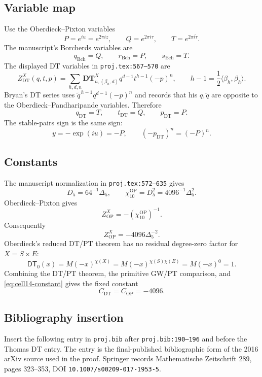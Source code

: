 \subsection{Variable map}

Use the Oberdieck--Pixton variables
\[
P=e^{iu}=e^{2\pi iz},\qquad
Q=e^{2\pi i\tau},\qquad
T=e^{2\pi i\widetilde\tau}.
\]
The manuscript's Borcherds variables are
\begin{equation}
\label{eq:cell14-borch-vars}
q_{\mathrm{Bch}}=Q,\qquad r_{\mathrm{Bch}}=P,\qquad
s_{\mathrm{Bch}}=T.
\end{equation}
The displayed DT variables in \texttt{proj.tex:567--570} are
\[
Z^X_{\mathrm{DT}}(q,t,p)
=\sum_{h,d,n}
\mathbf{DT}^X_{n,(\beta_h,d)}
q^{d-1}t^{h-1}(-p)^n,
\qquad h-1=\frac12\langle\beta_h,\beta_h\rangle.
\]
Bryan's DT series uses \(\widetilde q^{\,h-1}q^{d-1}(-p)^n\) and
records that his \(q,\widetilde q\) are opposite to the
Oberdieck--Pandharipande variables.  Therefore
\begin{equation}
\label{eq:cell14-dt-vars}
q_{\mathrm{DT}}=T,\qquad
t_{\mathrm{DT}}=Q,\qquad
p_{\mathrm{DT}}=P.
\end{equation}
The stable-pairs sign is the same sign:
\[
y=-\exp(iu)=-P,
\qquad
(-p_{\mathrm{DT}})^n=(-P)^n.
\]

\subsection{Constants}

The manuscript normalization in \texttt{proj.tex:572--635} gives
\[
D_5=64^{-1}\Delta_5,
\qquad
\chi_{10}^{\mathrm{OP}}=D_5^2=4096^{-1}\Delta_5^2.
\]
Oberdieck--Pixton gives
\[
Z^X_{\mathrm{OP}}
=-\left(\chi_{10}^{\mathrm{OP}}\right)^{-1}.
\]
Consequently
\begin{equation}
\label{eq:cell14-constant}
Z^X_{\mathrm{OP}}
=-4096\Delta_5^{-2}.
\end{equation}
Oberdieck's reduced DT/PT theorem has no residual degree-zero factor for
\(X=S\times E\):
\[
\mathsf{DT}_0(x)=M(-x)^{\chi(X)}
=M(-x)^{\chi(S)\chi(E)}
=M(-x)^0
=1.
\]
Combining the DT/PT theorem, the primitive GW/PT comparison, and
\eqref{eq:cell14-constant} gives the fixed constant
\[
C_{\mathrm{DT}}=C_{\mathrm{OP}}=-4096.
\]

\subsection{Bibliography insertion}

Insert the following entry in \texttt{proj.bib} after
\texttt{proj.bib:190--196} and before the Thomas DT entry.  The entry is
the final-published bibliographic form of the 2016 arXiv source used in
the proof.  Springer records Mathematische Zeitschrift 289, pages
323--353, DOI \texttt{10.1007/s00209-017-1953-5}.

